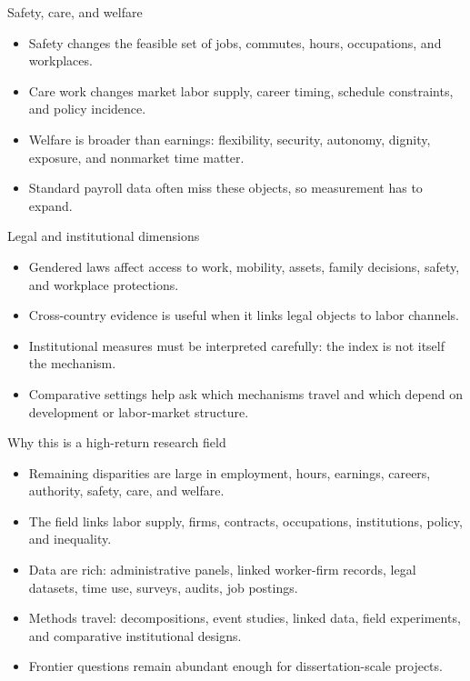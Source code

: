\documentclass[aspectratio=169,11pt]{beamer}
\begin{document}
\begin{frame}{Safety, care, and welfare}
\begin{itemize}
    \item Safety changes the feasible set of jobs, commutes, hours, occupations, and workplaces.
    \item Care work changes market labor supply, career timing, schedule constraints, and policy incidence.
    \item Welfare is broader than earnings: flexibility, security, autonomy, dignity, exposure, and nonmarket time matter.
    \item Standard payroll data often miss these objects, so measurement has to expand.
\end{itemize}
\end{frame}

\begin{frame}{Legal and institutional dimensions}
\begin{itemize}
    \item Gendered laws affect access to work, mobility, assets, family decisions, safety, and workplace protections.
    \item Cross-country evidence is useful when it links legal objects to labor channels.
    \item Institutional measures must be interpreted carefully: the index is not itself the mechanism.
    \item Comparative settings help ask which mechanisms travel and which depend on development or labor-market structure.
\end{itemize}
\end{frame}

\begin{frame}{Why this is a high-return research field}
\begin{itemize}
    \item Remaining disparities are large in employment, hours, earnings, careers, authority, safety, care, and welfare.
    \item The field links labor supply, firms, contracts, occupations, institutions, policy, and inequality.
    \item Data are rich: administrative panels, linked worker-firm records, legal datasets, time use, surveys, audits, job postings.
    \item Methods travel: decompositions, event studies, linked data, field experiments, and comparative institutional designs.
    \item Frontier questions remain abundant enough for dissertation-scale projects.
\end{itemize}
\end{frame}
\end{document}
